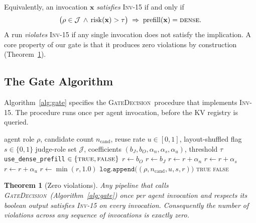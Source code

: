 \documentclass[10pt,twocolumn]{article}
\newcommand{\INV}[1]{\textsc{Inv-#1}}
\newcommand{\Risk}{\mathrm{risk}}
\newcommand{\Judge}{\mathcal{J}}
\newcommand{\Cand}{n_{\text{cand}}}
\newcommand{\Reuse}{u}
\newcommand{\Shuf}{s}
\newcommand{\GateDecision}{\textsc{GateDecision}}
\newtheorem{theorem}{Theorem}
\begin{document}
Equivalently, an invocation $\mathbf{x}$ \emph{satisfies} \INV{15} if and
only if
\begin{equation}
  \big(\rho \in \Judge \,\wedge\, \Risk(\mathbf{x}) > \tau\big)
  \;\Rightarrow\;
  \mathrm{prefill}(\mathbf{x}) = \textsc{dense}.
  \label{eq:inv15}
\end{equation}
A run \emph{violates} \INV{15} if any single invocation does not satisfy
the implication. A core property of our gate is that it produces zero
violations by construction (Theorem~\ref{thm:zero}).

\subsection{The Gate Algorithm}
\label{sec:invariant:algo}

Algorithm~\ref{alg:gate} specifies the \GateDecision\ procedure that
implements \INV{15}. The procedure runs once per agent invocation, before
the KV registry is queried.

\begin{algorithm*}[t]
\caption{\GateDecision: \INV{15}-enforcing preflight. A \textsc{true}
         return value signals that the invariant fires and the agent
         must use dense prefill. Cost is $O(1)$ per call.}
\label{alg:gate}
\begin{algorithmic}[1]
\Require agent role $\rho$, candidate count $\Cand$, reuse rate
         $\Reuse \in [0,1]$, layout-shuffled flag $\Shuf \in \{0,1\}$
\Require judge-role set $\Judge$, coefficients
         $(b_J, b_O, \alpha_n, \alpha_s, \alpha_u)$, threshold $\tau$
\Ensure \texttt{use\_dense\_prefill} $\in \{\textsc{true}, \textsc{false}\}$
\State $r \gets b_O$
\If{$\rho \in \Judge$} $r \gets b_J$ \EndIf
\If{$\Cand \geq 3$} $r \gets r + \alpha_n$ \EndIf
\If{$\Shuf = 1$} $r \gets r + \alpha_s$ \EndIf
\If{$\Reuse > 0.8$} $r \gets r + \alpha_u$ \EndIf
\State $r \gets \min(r, 1.0)$
\State $\texttt{log.append}\big((\rho, \Cand, \Reuse, \Shuf, r)\big)$
\If{$\rho \in \Judge$ \textbf{and} $r > \tau$}
  \State \Return \textsc{true}
\Else
  \State \Return \textsc{false}
\EndIf
\end{algorithmic}
\end{algorithm*}

\begin{theorem}[Zero violations]
\label{thm:zero}
Any pipeline that calls \GateDecision\ (Algorithm~\ref{alg:gate}) once per
agent invocation and respects its boolean output satisfies \INV{15} on
every invocation. Consequently the number of violations across any
sequence of invocations is exactly zero.
\end{theorem}
\end{document}
